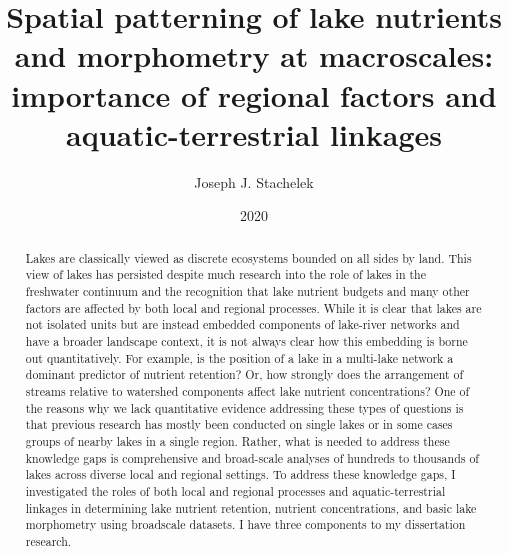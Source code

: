 \documentclass[]{msu-thesis}
\title{Spatial patterning of lake nutrients and morphometry at macroscales: importance of regional factors and aquatic-terrestrial linkages}
\author{Joseph J. Stachelek}
\date{2020}
\theoremstyle{definition}
\theoremstyle{definition}
\theoremstyle{definition}
\theoremstyle{remark}
\begin{document}

\maketitlepage
\begin{abstract}
Lakes are classically viewed as discrete ecosystems bounded on all sides by land. This view of lakes has persisted despite much research into the role of lakes in the freshwater continuum and the recognition that lake nutrient budgets and many other factors are affected by both local and regional processes. While it is clear that lakes are not isolated units but are instead embedded components of lake-river networks and have a broader landscape context, it is not always clear how this embedding is borne out quantitatively. For example, is the position of a lake in a multi-lake network a dominant predictor of nutrient retention? Or, how strongly does the arrangement of streams relative to watershed components affect lake nutrient concentrations? One of the reasons why we lack quantitative evidence addressing these types of questions is that previous research has mostly been conducted on single lakes or in some cases groups of nearby lakes in a single region. Rather, what is needed to address these knowledge gaps is comprehensive and broad-scale analyses of hundreds to thousands of lakes across diverse local and regional settings. To address these knowledge gaps, I investigated the roles of both local and regional processes and aquatic-terrestrial linkages in determining lake nutrient retention, nutrient concentrations, and basic lake morphometry using broadscale datasets. I have three components to my dissertation research.

\end{abstract}
\end{document}
